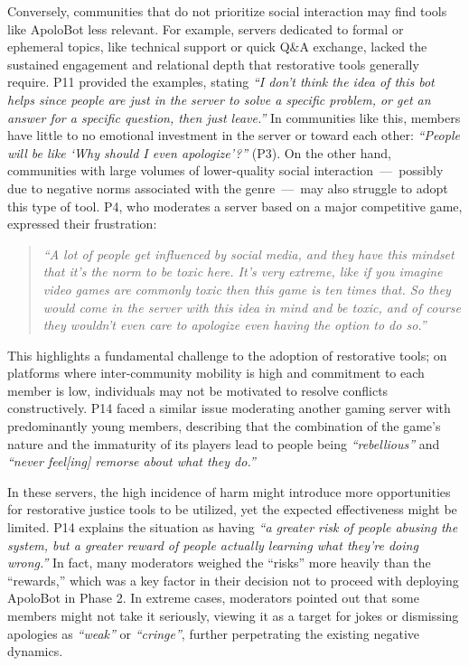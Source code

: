 Conversely, communities that do not prioritize social interaction may find tools like ApoloBot less relevant. For example, servers dedicated to formal or ephemeral topics, like technical support or quick Q\&A exchange, lacked the sustained engagement and relational depth that restorative tools generally require. P11 provided the examples, stating \textit{“I don't think the idea of this bot helps since people are just in the server to solve a specific problem, or get an answer for a specific question, then just leave.”} In communities like this, members have little to no emotional investment in the server or toward each other: \textit{``People will be like `Why should I even apologize'?''} (P3). On the other hand, communities with large volumes of lower-quality social interaction~---~possibly due to negative norms associated with the genre~---~may also struggle to adopt this type of tool. P4, who moderates a server based on a major competitive game, expressed their frustration:

\begin{quote} \textit{“A lot of people get influenced by social media, and they have this mindset that it’s the norm to be toxic here. It’s very extreme, like if you imagine video games are commonly toxic then this game is ten times that. So they would come in the server with this idea in mind and be toxic, and of course they wouldn't even care to apologize even having the option to do so.”} 
\end{quote}

This highlights a fundamental challenge to the adoption of restorative tools; on platforms where inter-community mobility is high and commitment to each member is low, individuals may not be motivated to resolve conflicts constructively. P14 faced a similar issue moderating another gaming server with predominantly young members, describing that the combination of the game's nature and the immaturity of its players lead to people being \textit{``rebellious''} and \textit{``never feel[ing] remorse about what they do.''} 

In these servers, the high incidence of harm might introduce more opportunities for restorative justice tools to be utilized, yet the expected effectiveness might be limited. P14 explains the situation as having \textit{“a greater risk of people abusing the system, but a greater reward of people actually learning what they're doing wrong.”} In fact, many moderators weighed the ``risks'' more heavily than the ``rewards,'' which was a key factor in their decision not to proceed with deploying ApoloBot in Phase 2. In extreme cases, moderators pointed out that some members might not take it seriously, viewing it as a target for jokes or dismissing apologies as \textit{``weak''} or \textit{``cringe''}, further perpetrating the existing negative dynamics.

